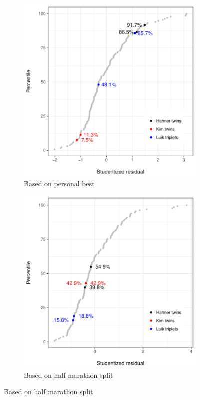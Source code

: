 \documentclass[12pt,titlepage]{article}
\begin{document}
\begin{figure}[!ht]
  \centering
  \caption{Studentized residuals from Olympic finishing time regressions}
  \label{fig:residuals}
  \begin{subfigure}{.495\textwidth}
    \centering
    \includegraphics[width=\textwidth, keepaspectratio]{studentized_residuals_no_quadratic.pdf}
    \caption{Based on personal best} 
    \label{fig:studentizedresiduals}
  \end{subfigure}
  \begin{subfigure}{.495\textwidth}
    \centering
    \includegraphics[width=\textwidth, keepaspectratio]{studentized_residuals_half_no_quadratic.pdf}
    \caption{Based on half marathon split}
    \label{fig:studentizedresiduals_half}
  \end{subfigure}
\end{figure}
\end{document}
